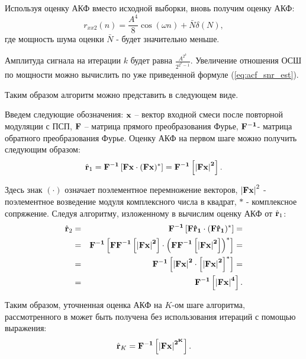 Используя оценку АКФ вместо исходной выборки, вновь получим оценку АКФ:
\begin{equation}
	r_{xx2}(n) = \frac{A^4}{8} \cos{(\omega n)} + \bar{N} \delta{(N)},
\end{equation}
где мощность шума оценки ${\bar{N}}$ - будет значительно меньше.

Амплитуда сигнала на итерации ${k}$ будет равна ${\frac{A^{2^k}}{2^{2^k-1}}}$. Увеличение отношения ОСШ по мощности можно
вычислить по уже приведенной формуле (\ref{eq:acf_snr_est}). 

Таким образом алгоритм можно представить в следующем виде.

Введем следующие обозначения: ${\bf{x}}$ – вектор входной смеси после повторной модуляции с ПСП, ${\bf{F}}$ – матрица прямого преобразования Фурье,
${\bf{F}^{-1}}$- матрица обратного преобразования Фурье.  Оценку АКФ на первом шаге можно получить следующим образом:
\begin{equation}
	\label{eq:akf_1}
	\hat{\bf{r}}_1 = \bf{F}^{-1}\left[ \bf{Fx} \cdot (\bf{Fx})^* \right] = \bf{F}^{-1} \left[ \left| \bf{Fx} \right| ^2 \right].
\end{equation}

Здесь знак ${(\cdot)}$  означает поэлементное перемножение векторов, ${\left| \bf{Fx} \right| ^2}$ - поэлементное возведение модуля комплексного числа в квадрат, ${*}$ -
комплексное сопряжение.  Следуя алгоритму, изложенному в \cite{ostanin_akf} вычислим оценку АКФ от ${\hat{\bf{r}}_1}$:
\begin{eqnarray}
	\label{eq:akf_2}
	\hat{\bf{r}}_2 & = & \bf{F}^{-1}\left[ \bf{F} \hat{\bf{r}}_1 \cdot (\bf{F} \hat{\bf{r}}_1)^* \right] = \nonumber \\
		& = & \bf{F}^{-1}	\left[ 
				\bf{FF}^{-1} \left[
						\left| \bf{Fx} \right| ^2
					\right]
						\cdot \left( \bf{FF}^{-1} \left[ \left| \bf{Fx} \right| ^2 \right]
					\right) ^*
			\right] = \nonumber \\
		& = & \bf{F}^{-1} \left[ \left| \bf{Fx} \right| ^2 \cdot \left[ \left| \bf{Fx} \right| ^2 \right] ^* \right] =  \nonumber \\
		& = & \bf{F}^{-1} \left[ \left| \bf{Fx} \right| ^4 \right].
\end{eqnarray}

Таким образом, уточненная оценка АКФ на ${K}$-ом шаге алгоритма, рассмотренного в \cite{ostanin_akf}
может быть получена без использования итераций с помощью выражения:
\begin{equation}
	\label{eq:akf_3}
	\hat{\bf{r}}_K = \bf{F}^{-1}\left[ \left| \bf{Fx} \right| ^{2^K} \right].
\end{equation}

